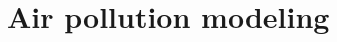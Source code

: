 \documentclass[journal]{IEEEtran}
\begin{document}
%




\section{Air pollution modeling}
\end{document}

